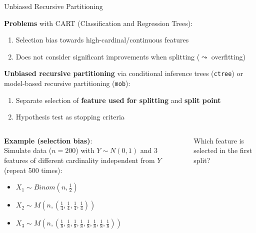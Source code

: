 \documentclass[11pt,compress,t,notes=noshow, aspectratio=169, xcolor=table]{beamer}
\begin{document}
\begin{frame}{Unbiased Recursive Partitioning}  
\vspace{-0.2cm}

\vspace{0.2cm}
\textbf{Problems} with CART (Classification and Regression Trees): 

\begin{enumerate}
    \item Selection bias towards high-cardinal/continuous features 
    \item Does not consider significant improvements when splitting ($\leadsto$ overfitting)
\end{enumerate}
\smallskip
\pause
\textbf{Unbiased recursive partitioning} via conditional inference trees (\texttt{ctree}) or model-based recursive partitioning (\texttt{mob}): 
\begin{enumerate}  
  \item Separate selection of \textbf{feature used for splitting} and \textbf{split point}
  \item Hypothesis test as stopping criteria 
\end{enumerate}
\pause
\begin{columns}[T, totalwidth = \textwidth]
    \begin{column}{0.5\textwidth}
    \textbf{Example (selection bias)}: \\
         Simulate data ($n = 200$) with $Y \sim N(0,1)$ and 3 features of different cardinality independent from $Y$ (repeat 500 times):
\begin{itemize}
    \item $X_1 \sim Binom(n, \frac{1}{2})$
    \item $X_2 \sim M(n, (\frac{1}{4}, \frac{1}{4}, \frac{1}{4}, \frac{1}{4}))$
    \item $X_3 \sim M(n, (\frac{1}{8}, \frac{1}{8}, \frac{1}{8}, \frac{1}{8}, \frac{1}{8}, \frac{1}{8}, \frac{1}{8}, \frac{1}{8}))$
\end{itemize}
    \end{column}
    \begin{column}{0.5\textwidth}
    \scriptsize
    \centering
    Which feature is selected in the first split?

\end{column}
\end{columns}
\end{frame}
\end{document}

